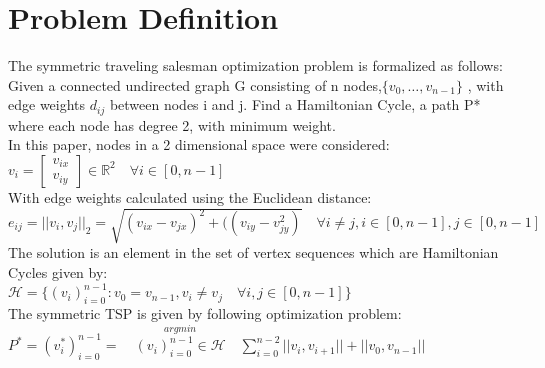 \documentclass[format=sigconf]{acmart}
\begin{document}
\section*{Problem Definition}
The symmetric traveling salesman optimization problem is formalized as follows:\\
Given a connected undirected graph G consisting of n nodes,$\{v_0, \hdots, v_{n-1}\}$ , with edge weights $d_{ij}$ between nodes i and j.
Find a Hamiltonian Cycle, a path P* where each node has degree 2, with minimum weight.\\
In this paper, nodes in a 2 dimensional space were considered: $v_i = \begin{bmatrix}
v_{ix} \\ v_{iy} 
\end{bmatrix} \in \mathbb{R}^2 \quad \forall i \in [0,n-1]$\\
With edge weights calculated using the Euclidean distance: $e_{ij} = || v_i, v_j ||_2 = \sqrt{(v_{ix}-v_{jx})^2 + ((v_{iy}-v_{jy}^2)} \quad \forall i\neq j, i \in [0,n-1], j \in [0,n-1]$\\
The solution is an element in the set of vertex sequences which are Hamiltonian Cycles given by:\\
$\mathcal{H} = \{ (v_i)_{i=0}^{n-1} : v_0 = v_{n-1}, v_i \neq v_j \quad \forall i,j \in [0,n-1]\}$\\
The symmetric TSP is given by following optimization problem:\\ 
$P^*=(v^*_i)_{i=0}^{n-1} =\quad  \stackrel{argmin}{(v_i)_{i=0}^{n-1} \in \mathcal{H}} \quad \sum_{i=0}^{n-2} ||v_i, v_{i+1} || + ||v_0, v_{n-1} || $
\end{document}
